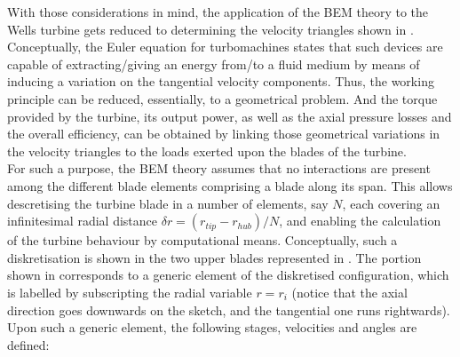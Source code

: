 With those considerations in mind, the application of the BEM theory to the Wells turbine gets reduced to determining the velocity triangles shown in . Conceptually, the Euler equation for turbomachines states that such devices are capable of extracting/giving an energy from/to a fluid medium by means of inducing a variation on the tangential velocity components. Thus, the working principle can be reduced, essentially, to a geometrical problem. And the torque provided by the turbine, its output power, as well as the axial pressure losses and the overall efficiency, can be obtained by linking those geometrical variations in the velocity triangles to the loads exerted upon the blades of the turbine.\\
For such a purpose, the BEM theory assumes that no interactions are present among the different blade elements comprising a blade along its span. This allows descretising the turbine blade in a number of elements, say $N$, each covering an infinitesimal radial distance $\delta{r}=\left(r_{tip}-r_{hub}\right)/N$, and enabling the calculation of the turbine behaviour by computational means. Conceptually, such a diskretisation is shown in the two upper blades represented in . The portion shown in  corresponds to a generic element of the diskretised configuration, which is labelled by subscripting the radial variable $r=r_{i}$ (notice that the axial direction goes downwards on the sketch, and the tangential one runs rightwards). Upon such a generic element, the following stages, velocities and angles are defined:
